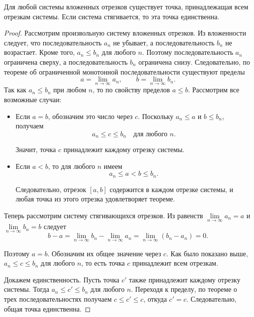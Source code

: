 \begin{theorem}
Для любой системы вложенных отрезков существует точка, принадлежащая всем отрезкам системы.
Если система стягивается, то эта точка единственна.

\begin{proof}
Рассмотрим произвольную систему вложенных отрезков.
Из вложенности следует, что последовательность \(a_{n}\) не убывает,
а последовательность \(b_{n}\) не возрастает. Кроме того,
\(a_{n}\leq b_{n}\) для любого \(n\). Поэтому последовательность
\(a_{n}\) ограничена сверху, а последовательность \(b_{n}\) ограничена
снизу. Следовательно, по теореме об ограниченной монотонной
последовательности существуют пределы
\[
a = \lim_{n \to \infty} a_{n}, \qquad b = \lim_{n \to \infty} b_{n}.
\]
Так как \(a_{n}\leq b_{n}\) при любом \(n\), то по свойству пределов \(a\leq b\).
Рассмотрим все возможные случаи:

\begin{itemize}
\item Если \(a=b\), обозначим это число через \(c\). Поскольку
\(a_{n}\leq a\) и \(b\leq b_{n}\), получаем
\[
a_{n} \leq c \leq b_{n} \quad \text{для любого } n.
\]

Значит, точка \(c\) принадлежит каждому отрезку системы.

\item Если \(a<b\), то для любого \(n\) имеем
\[
a_{n} \leq a < b \leq b_{n}.
\]

Следовательно, отрезок \([a,b]\) содержится в каждом отрезке
системы, и любая точка из этого отрезка удовлетворяет теореме.
\end{itemize}

Теперь рассмотрим систему стягивающихся отрезков. Из равенств
\(\underset{n \to \infty}{\lim} a_{n} = a\) и
\(\underset{n \to \infty}{\lim} b_{n} = b\) следует
\[
b - a = \lim_{ n \to \infty } b_{n} - \lim_{ n \to \infty } a_{n} =
\lim_{n \to \infty}(b_{n} - a_{n}) = 0.
\]

Поэтому \(a = b\). Обозначим их общее значение через \(c\). Как было
показано выше, \(a_{n} \leq c \leq b_{n}\) для любого \(n\), то есть
точка \(c\) принадлежит всем отрезкам.

Докажем единственность. Пусть точка \(c'\) также принадлежит каждому
отрезку системы. Тогда \(a_{n} \leq c' \leq b_{n}\) для любого \(n\).
Переходя к пределу, по теореме о трех последовательностях
получаем \(c \leq c' \leq c\), откуда \(c' = c\).
Следовательно, общая точка единственна.
\end{proof}
\end{theorem}